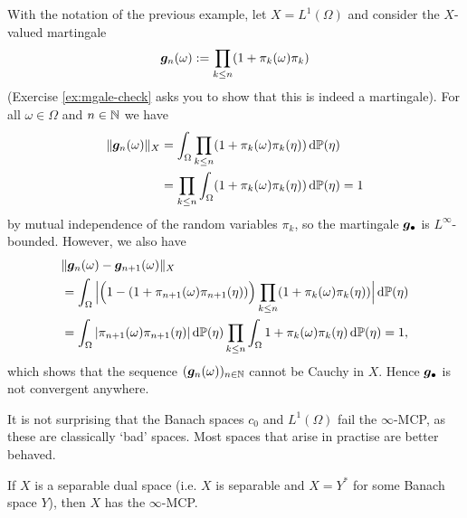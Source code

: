 \begin{example}\label{eg:L1-noMCP}
  With the notation of the previous example, let $X = L^1(\Omega)$ and consider the $X$-valued martingale
  \begin{equation}\label{eq:L1-example-mgale}
    \bm{g}_n(\omega) := \prod_{k \leq n} (1 + \pi_{k}(\omega)\pi_k)
  \end{equation}
  (Exercise \ref{ex:mgale-check} asks you to show that this is indeed a martingale).
  For all $\omega \in \Omega$ and $n \in \mathbb{N}$ we have
  \begin{equation*}
    \begin{aligned}
      \|\bm{g}_n(\omega)\|_{X} &= \int_{\Omega} \prod_{k \leq n} (1 + \pi_k(\omega)\pi_k(\eta))  \, \mathrm{d}\mathbb{P}(\eta) \\
      &= \prod_{k \leq n} \int_{\Omega}  (1 + \pi_k(\omega)\pi_k(\eta)) \, \mathrm{d}\mathbb{P}(\eta)
      = 1
    \end{aligned}
  \end{equation*}
  by mutual independence of the random variables $\pi_k$, so the martingale $\bm{g}_{\bullet}$ is $L^\infty$-bounded.
  However, we also have
  \begin{equation*}
    \begin{aligned}
      &\|\bm{g}_{n}(\omega) - \bm{g}_{n+1}(\omega)\|_{X} \\
      &= \int_{\Omega} \Big| \Big(1 - (1 + \pi_{n+1}(\omega)\pi_{n+1}(\eta))\Big)\prod_{k \leq n} (1 + \pi_k(\omega)\pi_k(\eta)) \Big|\, \mathrm{d}\mathbb{P}(\eta) \\
      &= \int_{\Omega} |\pi_{n+1}(\omega) \pi_{n+1}(\eta)| \, \mathrm{d}\mathbb{P}(\eta) \prod_{k \leq n} \int_{\Omega} 1 + \pi_k(\omega)\pi_k(\eta) \, \mathrm{d}\mathbb{P}(\eta) = 1,
    \end{aligned}
  \end{equation*}
  which shows that the sequence $(\bm{g}_n(\omega))_{n \in \mathbb{N}}$ cannot be Cauchy in $X$.
  Hence $\bm{g}_{\bullet}$ is not convergent anywhere.
\end{example}

It is not surprising that the Banach spaces $c_0$ and $L^1(\Omega)$ fail the $\infty$-MCP, as these are classically `bad' spaces.
Most spaces that arise in practise are better behaved.

\begin{thm}\label{thm:MCP-sepdual}
  If $X$ is a separable dual space (i.e. $X$ is separable and $X = Y^*$ for some Banach space $Y$), then $X$ has the $\infty$-MCP.
\end{thm}

